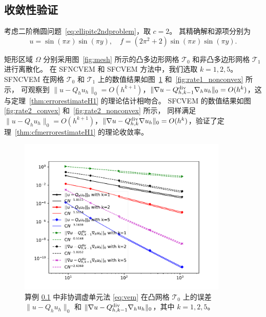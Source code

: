 \subsection{收敛性验证}
\label{sec:convergence}

考虑二阶椭圆问题~\eqref{eq:ellipitc2ndproblem}，取 $c = 2$。  
其精确解和源项分别为
\[
    u = \sin(\pi x)\sin(\pi y), \quad f = (2\pi^2+2)\sin(\pi x)\sin(\pi y).
\]

矩形区域 $\Omega$ 分别采用图~\ref{fig:mesh} 所示的凸多边形网格 $\mathcal{T}_0$ 和非凸多边形网格 $\mathcal{T}_1$ 进行离散化。  
在 SFNCVEM 和 SFCVEM 方法中，我们选取 $k = 1, 2, 5$。  
SFNCVEM 在网格 $\mathcal{T}_0$ 和 $\mathcal{T}_1$
上的数值结果如图~\ref{fig:rate1_convex} 和~\ref{fig:rate1_nonconvex} 所示，
可观察到 $\|u - Q_h u_h\|_0 = O(h^{k+1})$，$\|\nabla u - Q_{h, k-1}^{\operatorname{div}} \nabla_h u_h\|_0 = O(h^{k})$，这与定理~\ref{thm:errorestimateH1} 的理论估计相吻合。  
SFCVEM 的数值结果如图~
\ref{fig:rate2_convex} 和~\ref{fig:rate2_nonconvex} 所示，
同样满足 $\|u - Q_h u_h\|_0 = O(h^{k+1})$，$\|\nabla u - Q_{h, k}^{\operatorname{div}} \nabla u_h\|_0 = O(h^{k})$，验证了定理~\ref{thm:cfmerrorestimateH1} 的理论收敛率。

\begin{figure}[htp]
\centering
\includegraphics[width=10cm]{./figures/stabfree/ncvem_convex.pdf}
\caption{算例 \ref{sec:convergence} 中非协调虚单元法 \eqref{eq:vem} 在凸网格 $\mathcal T_0$ 上的误差 $\|u - Q_h u_h\|_0$ 和 $\|\nabla u - Q_{h, k-1}^{\operatorname{div}}\nabla_h u_h\|_0$，其中 $k=1,2,5$。}
\label{fig:rate1_convex}
\end{figure}

